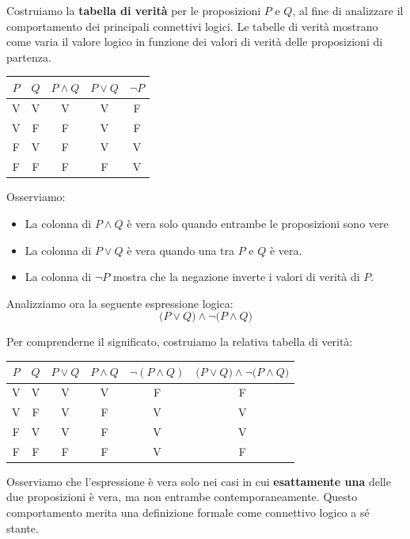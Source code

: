 \begin{esempio} 
Costruiamo la \textbf{tabella di verità} per le proposizioni \(P\) e \(Q\), al fine di analizzare il comportamento dei principali connettivi logici. Le tabelle di verità mostrano come varia il valore logico in funzione dei valori di verità delle proposizioni di partenza.
    
    \begin{center}    
    \begin{tabular}{c|c|c|c|c}
      \(P\) & \(Q\) & \(P \land Q\) & \(P \lor Q\) & \(\neg P\) \\
      \hline
      V & V & V & V & F \\
      V & F & F & V & F \\
      F & V & F & V & V \\
      F & F & F & F & V \\
    \end{tabular}
    \end{center}
    
    \medskip Osserviamo:
    
    \begin{itemize}
        \item La colonna di \(P \land Q\) è vera solo quando entrambe le proposizioni sono vere 
        \item  La colonna di \( P \lor Q \) è vera quando una tra $P$ e $Q$ è vera.
        \item La colonna di \(\neg P\) mostra che la negazione inverte  i valori di verità di $P$. 
    \end{itemize}
\end{esempio}

\begin{esempio}
Analizziamo ora la seguente espressione logica:
    \[
    \bigl(P \lor Q \bigr) \land \neg\bigl(P \land Q \bigr)
    \]
    
Per comprenderne il significato, costruiamo la relativa tabella di verità:

    \begin{center}
    \begin{tabular}{c c|c c c|c}
      \(P\) & \(Q\) & \(P \lor Q\) & \(P \land Q\) & \(\neg(P \land Q)\) & \(\bigl(P \lor Q\bigr) \land \neg\bigl(P \land Q\bigr) \) \\
      \hline
      V & V & V & V & F & F \\
      V & F & V & F & V & V \\
      F & V & V & F & V & V \\
      F & F & F & F & V & F \\
    \end{tabular}
    \end{center}
    Osserviamo che l'espressione è vera solo nei casi in cui \textbf{ esattamente una} delle due proposizioni è vera, ma non entrambe contemporaneamente. Questo comportamento merita una definizione formale come connettivo logico a sé stante.
\end{esempio}
    
